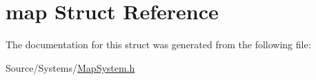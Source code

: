 \hypertarget{structmap}{}\section{map Struct Reference}
\label{structmap}


The documentation for this struct was generated from the following file\+:\begin{DoxyCompactItemize}
\item 
Source/\+Systems/\mbox{\hyperlink{_map_system_8h}{Map\+System.\+h}}\end{DoxyCompactItemize}
